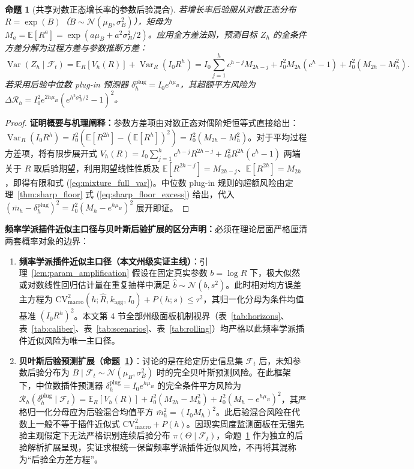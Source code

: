 \documentclass[10pt,a4paper]{article}
\theoremstyle{plain}
\newtheorem{proposition}{命题}
\theoremstyle{definition}
\begin{document}
\begin{proposition}[共享对数正态增长率的参数后验混合]\label{prop:posterior_mixture}
若增长率后验服从对数正态分布 $R = \exp(B)$（$B \sim \mathcal{N}(\mu_B, \sigma_B^2)$），矩母为 $M_a = \mathbb{E}[R^a] = \exp(a\mu_B + a^2\sigma_B^2/2)$。应用全方差法则，预测目标 $Z_h$ 的全条件方差分解为过程方差与参数推断方差：
\begin{equation}
\operatorname{Var}(Z_h \mid \mathcal{F}_t) = \mathbb{E}_R[V_h(R)] + \operatorname{Var}_R(I_0 R^h) = I_0 \sum_{j=1}^h c^{h-j} M_{2h-j} + I_0^2 M_{2h}(c^h - 1) + I_0^2(M_{2h} - M_h^2). \label{eq:mixture_full_var}
\end{equation}
若采用后验中位数 plug-in 预测器 $\delta_h^{\text{plug}} = I_0 e^{h\mu_B}$，其超额平方风险为 $\Delta \mathcal{R}_h = I_0^2 e^{2h\mu_B}(e^{h^2\sigma_B^2/2} - 1)^2$。
\end{proposition}

\begin{proof}
\textbf{证明概要与机理阐释：}参数方差项由对数正态对偶阶矩恒等式直接给出：$\operatorname{Var}_R(I_0 R^h) = I_0^2(\mathbb{E}[R^{2h}] - (\mathbb{E}[R^h])^2) = I_0^2(M_{2h} - M_h^2)$。对于平均过程方差项，将有限步展开式 $V_h(R) = I_0 \sum_{j=1}^h c^{h-j} R^{2h-j} + I_0^2 R^{2h}(c^h - 1)$ 两端关于 $R$ 取后验期望，利用期望线性性质及 $\mathbb{E}[R^{2h-j}] = M_{2h-j}$、$\mathbb{E}[R^{2h}] = M_{2h}$，即得有限和式 (\ref{eq:mixture_full_var})。中位数 plug-in 规则的超额风险由定理~\ref{thm:sharp_floor} 式 (\ref{eq:sharp_floor_excess}) 给出，代入 $(\bar{m}_h - \delta_h^{\text{plug}})^2 = I_0^2(M_h - e^{h\mu_B})^2$ 展开即证。
\end{proof}

\noindent\textbf{频率学派插件近似主口径与贝叶斯后验扩展的区分声明：}必须在理论层面严格厘清两套概率对象的边界：
\begin{enumerate}
\item \textbf{频率学派插件近似主口径（本文州级实证主线）}：引理~\ref{lem:param_amplification} 假设在固定真实参数 $b = \log R$ 下，极大似然或对数线性回归估计量在重复抽样中满足 $\hat{b} \sim \mathcal{N}(b, s^2)$。此时相对均方误差主方程为 $\text{CV}^2_{\text{macro}}(h; \hat{R}, k_{\text{agg}}, I_0) + P(h; s) \le \tau^2$，其归一化分母为条件均值基准 $(I_0 R^h)^2$。本文第 4 节全部州级面板机制视界（表~\ref{tab:horizons}、表~\ref{tab:caliber}、表~\ref{tab:scenarios}、表~\ref{tab:rolling}）均严格以此频率学派插件近似风险为唯一主口径。
\item \textbf{贝叶斯后验预测扩展（命题~\ref{prop:posterior_mixture}）}：讨论的是在给定历史信息集 $\mathcal{F}_t$ 后，未知参数后验分布为 $B \mid \mathcal{F}_t \sim \mathcal{N}(\mu_B, \sigma_B^2)$ 时的完全贝叶斯预测风险。在此框架下，中位数插件预测器 $\delta_h^{\text{plug}} = I_0 e^{h\mu_B}$ 的完全条件平方风险为 $\mathcal{R}_h(\delta_h^{\text{plug}} \mid \mathcal{F}_t) = \mathbb{E}_R[V_h(R)] + I_0^2(M_{2h} - M_h^2) + I_0^2(M_h - e^{h\mu_B})^2$，其严格归一化分母应为后验混合均值平方 $\bar{m}_h^2 = (I_0 M_h)^2$。此后验混合风险在代数上一般不等于插件近似式 $\text{CV}^2_{\text{macro}} + P(h)$。因现实周度监测面板在无强先验主观假定下无法严格识别连续后验分布 $\pi(\Theta \mid \mathcal{F}_t)$，命题~\ref{prop:posterior_mixture} 作为独立的后验解析扩展呈现，实证求根统一保留频率学派插件近似风险，不再将其混称为“后验全方差方程”。
\end{enumerate}
\end{document}
